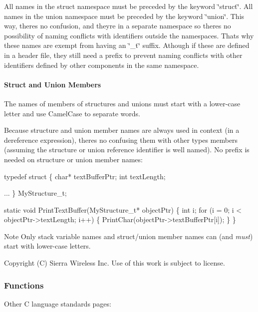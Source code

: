 All names in the struct namespace must be preceded by the keyword \char`\"{}struct\char`\"{}. All names in the union namespace must be preceded by the keyword \char`\"{}union\char`\"{}. This way, there\textquotesingle{}s no confusion, and they\textquotesingle{}re in a separate namespace so there\textquotesingle{}s no possibility of naming conflicts with identifiers outside the namespaces. That\textquotesingle{}s why these names are exempt from having an \char`\"{}\+\_\+t\char`\"{} suffix. Athough if these are defined in a header file, they still need a prefix to prevent naming conflicts with other identifiers defined by other components in the same namespace.\hypertarget{ccoding_stds_name_types_cstdsStructandUnionMembers}{}\paragraph{Struct and Union Members}\label{ccoding_stds_name_types_cstdsStructandUnionMembers}
The names of members of structures and unions must start with a lower-\/case letter and use Camel\+Case to separate words.

Because structure and union member names are always used in context (in a dereference expression), there\textquotesingle{}s no confusing them with other types\textquotesingle{} members (assuming the structure or union reference identifier is well named). No prefix is needed on structure or union member names\+:


\begin{DoxyCode}
\textcolor{keyword}{typedef} \textcolor{keyword}{struct}
\{
    \textcolor{keywordtype}{char}* textBufferPtr;
    \textcolor{keywordtype}{int}   textLength;

    ...
\}
MyStructure\_t;

\textcolor{keyword}{static} \textcolor{keywordtype}{void} PrintTextBuffer(MyStructure\_t* objectPtr)
\{
    \textcolor{keywordtype}{int} i;
    \textcolor{keywordflow}{for} (i = 0; i < objectPtr->textLength; i++)
    \{
        PrintChar(objectPtr->textBufferPtr[i]);
    \}
\}
\end{DoxyCode}


\begin{DoxyNote}{Note}
Only stack variable names and struct/union member names can (and {\itshape must}) start with lower-\/case letters.
\end{DoxyNote}




Copyright (C) Sierra Wireless Inc. Use of this work is subject to license. \hypertarget{ccodingStdsNameFuncs}{}\subsubsection{Functions}\label{ccodingStdsNameFuncs}
Other C language standards\textquotesingle{} pages\+:

